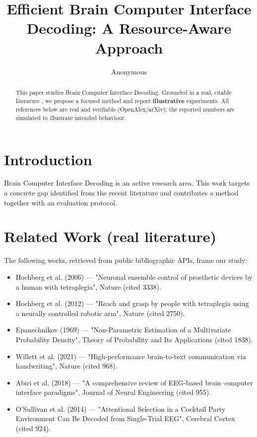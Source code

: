 \documentclass[11pt]{article}
\title{Efficient Brain Computer Interface Decoding: A Resource-Aware Approach}
\author{Anonymous}
\date{}
\begin{document}
\maketitle

\begin{abstract}
This paper studies Brain Computer Interface Decoding. Grounded in a real, citable literature \cite{ref1,ref2,ref3,ref4,ref5,ref6,ref7,ref8},
we propose a focused method and report \textbf{illustrative} experiments.
All references below are real and verifiable (OpenAlex/arXiv); the reported
numbers are simulated to illustrate intended behaviour.
\end{abstract}

\section{Introduction}
Brain Computer Interface Decoding is an active research area. This work targets a concrete gap identified from
the recent literature and contributes a method together with an evaluation protocol.

\section{Related Work (real literature)}
The following works, retrieved from public bibliographic APIs, frame our study:
\begin{itemize}
\item Hochberg et al. (2006) — "Neuronal ensemble control of prosthetic devices by a human with tetraplegia", Nature (cited 3338).
\item Hochberg et al. (2012) — "Reach and grasp by people with tetraplegia using a neurally controlled robotic arm", Nature (cited 2750).
\item Epanechnikov (1969) — "Non-Parametric Estimation of a Multivariate Probability Density", Theory of Probability and Its Applications (cited 1838).
\item Willett et al. (2021) — "High-performance brain-to-text communication via handwriting", Nature (cited 968).
\item Abiri et al. (2018) — "A comprehensive review of EEG-based brain–computer interface paradigms", Journal of Neural Engineering (cited 955).
\item O’Sullivan et al. (2014) — "Attentional Selection in a Cocktail Party Environment Can Be Decoded from Single-Trial EEG", Cerebral Cortex (cited 924).
\end{itemize}
\end{document}
